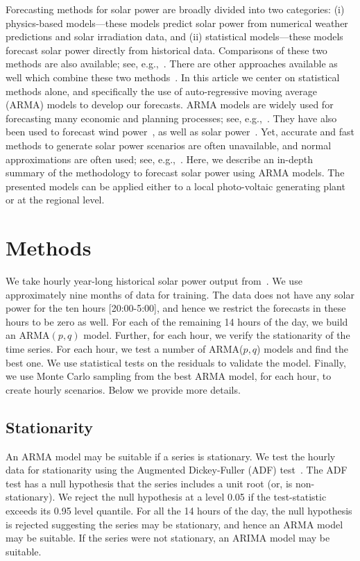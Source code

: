 \documentclass[review]{elsarticle}
\begin{document}
Forecasting methods for solar power are broadly divided 
into two categories: (i) physics-based models---these models predict solar power 
from numerical weather predictions and solar irradiation data, and (ii) statistical models---these 
models forecast 
solar power directly from historical data. Comparisons of these two 
methods are also available; see, 
e.g.,~\cite{huang2010comparative,inman2013solar}. There are other 
approaches available as well which combine these two 
methods~\cite{chen2011online}. 
In this article we center on  statistical  methods alone, and specifically the 
use of auto-regressive moving average (ARMA) 
models to develop our forecasts. ARMA models are widely used for forecasting 
many economic and planning processes; see, e.g.,~\cite{box2008time}. They 
 have also been used to forecast wind power~\cite{brown1984time, 
duran2007short}, as well as solar 
power~\cite{mora1998multiplicative,huang2012solar}.  Yet, accurate and 
fast methods to generate solar power scenarios are often unavailable, and 
normal approximations are often used; see, e.g.,~\cite{su2014stochastic}. Here, 
we describe an  
in-depth summary of the methodology to forecast solar power using ARMA models. 
The presented models can 
be applied either to a local photo-voltaic generating plant or  at the regional 
level.

\section{Methods}
We take hourly year-long historical solar power output 
from~\cite{golestaneh2016generation}. We use approximately nine months of data 
for training. The data does not have any solar power for the ten hours 
[20:00-5:00], and hence we restrict the forecasts in these hours to be zero as 
well. For each of the remaining 14 hours of the day, we build an ARMA$(p,q)$ 
model. Further, for each hour, we verify the stationarity of the time 
series. For each hour, we test a number of ARMA($p,q$) models and find the best 
one. We use statistical tests on the residuals to validate the model. Finally, 
we use Monte Carlo sampling from the best ARMA model, for each hour, to create 
hourly scenarios. Below we provide more details.

\subsection{Stationarity}
An ARMA model may be suitable if a series is stationary. We test 
the hourly data for stationarity using the Augmented 
Dickey-Fuller (ADF) test~\cite{dickey1979distribution}. The ADF test has a null 
hypothesis that the series includes a unit root (or, is non-stationary). We 
reject the null hypothesis at a level 0.05 if the test-statistic exceeds its 
0.95 level quantile. For all the 14 hours of the day, the null hypothesis is 
rejected suggesting the series may be stationary, and hence an ARMA model may 
be suitable. If the series were not stationary, an ARIMA model may be suitable.
\end{document}
